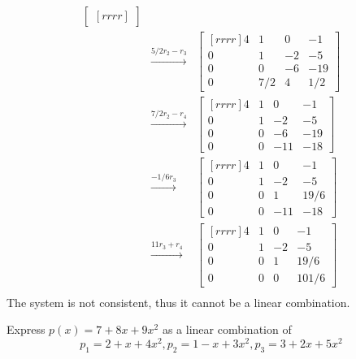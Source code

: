\begin{solution}
\begin{eqnarray*}
\begin{bmatrix}[rrrr]
\end{bmatrix}\\
&\xrightarrow[]{5/2r_2 - r_3}&
\begin{bmatrix}[rrrr]
4&1&0&-1\\
0&1&-2&-5\\
0&0&-6&-19\\
0&7/2&4&1/2
\end{bmatrix}\\
&\xrightarrow[]{7/2r_2 - r_4}&
\begin{bmatrix}[rrrr]
4&1&0&-1\\
0&1&-2&-5\\
0&0&-6&-19\\
0&0&-11&-18
\end{bmatrix}\\
&\xrightarrow[]{-1/6r_3}&
\begin{bmatrix}[rrrr]
4&1&0&-1\\
0&1&-2&-5\\
0&0&1&19/6\\
0&0&-11&-18
\end{bmatrix}\\
&\xrightarrow[]{11r_3 + r_4}&
\begin{bmatrix}[rrrr]
4&1&0&-1\\
0&1&-2&-5\\
0&0&1&19/6\\
0&0&0&101/6
\end{bmatrix}\\
\end{eqnarray*}
The system is not consistent, thus it cannot be a linear combination.
\end{solution}
\ii Express $p(x)=7 +8x + 9x^2$ as a linear combination of
$$
p_1 = 2 + x + 4x^2, p_2=1-x+3x^2, p_3=3+2x+5x^2
$$

